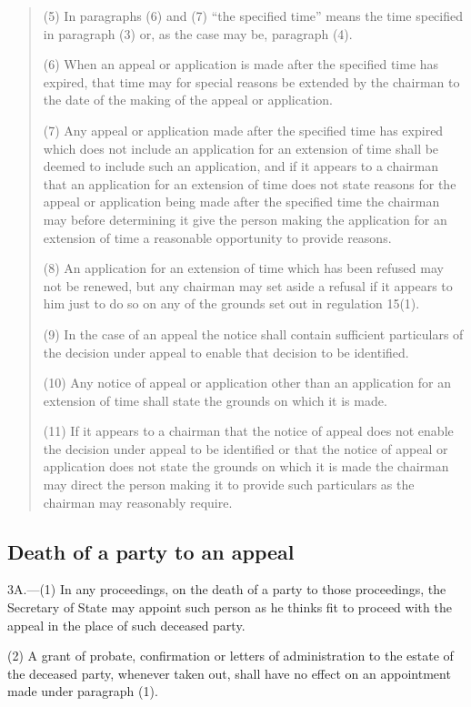 \documentclass[a4paper]{article}
\begin{document}
{\begin{quotation}
(5) In paragraphs (6) and (7) “the specified time” means the time specified in paragraph (3) or, as the case may be, paragraph (4).

(6) When an appeal or application is made after the specified time has expired, that time may for special reasons be extended by the chairman to the date of the making of the appeal or application.

(7) Any appeal or application made after the specified time has expired which does not include an application for an extension of time shall be deemed to include such an application, and if it appears to a chairman that an application for an extension of time does not state reasons for the appeal or application being made after the specified time the chairman may before determining it give the person making the application for an extension of time a reasonable opportunity to provide reasons.

(8) An application for an extension of time which has been refused may not be renewed, but any chairman may set aside a refusal if it appears to him just to do so on any of the grounds set out in regulation 15(1).

(9) In the case of an appeal the notice shall contain sufficient particulars of the decision under appeal to enable that decision to be identified.

(10) Any notice of appeal or application other than an application for an extension of time shall state the grounds on which it is made.

(11) If it appears to a chairman that the notice of appeal does not enable the decision under appeal to be identified or that the notice of appeal or application does not state the grounds on which it is made the chairman may direct the person making it to provide such particulars as the chairman may reasonably require.
\end{quotation}
}

\subsection[3A. Death of a party to an appeal]{Death of a party to an appeal}

3A.—(1) In any proceedings, on the death of a party to those proceedings, the Secretary of State may appoint such person as he thinks fit to proceed with the appeal in the place of such deceased party.

(2) A grant of probate, confirmation or letters of administration to the estate of the deceased party, whenever taken out, shall have no effect on an appointment made under paragraph (1).
\end{document}
